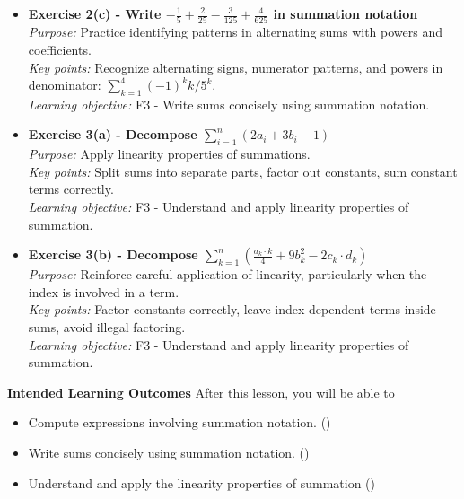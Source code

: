 \documentclass[10pt]{article}
\begin{document}
{{\begin{itemize}
    \item \textbf{Exercise 2(c) - Write $-\frac15+\frac2{25}-\frac3{125}+\frac4{625}$ in summation notation} \\
    \textit{Purpose:} Practice identifying patterns in alternating sums with powers and coefficients. \\
    \textit{Key points:} Recognize alternating signs, numerator patterns, and powers in denominator: $\sum_{k=1}^{4} (-1)^k k/5^k$. \\
    \textit{Learning objective:} F3 - Write sums concisely using summation notation.

    \item \textbf{Exercise 3(a) - Decompose $\displaystyle\sum_{i=1}^n (2a_i+3b_i-1)$} \\
    \textit{Purpose:} Apply linearity properties of summations. \\
    \textit{Key points:} Split sums into separate parts, factor out constants, sum constant terms correctly. \\
    \textit{Learning objective:} F3 - Understand and apply linearity properties of summation.

    \item \textbf{Exercise 3(b) - Decompose $\displaystyle\sum_{k=1}^n \left(\frac{a_k\cdot k}4+9b_k^2-2c_k\cdot d_k\right)$} \\
    \textit{Purpose:} Reinforce careful application of linearity, particularly when the index is involved in a term. \\
    \textit{Key points:} Factor constants correctly, leave index-dependent terms inside sums, avoid illegal factoring. \\
    \textit{Learning objective:} F3 - Understand and apply linearity properties of summation.
\end{itemize}
}}

\textbf{Intended Learning Outcomes}
After this lesson, you will be able to 

\begin{itemize}
    \item Compute expressions involving summation notation. ()
    \item Write sums concisely using summation notation. ()
    \item Understand and apply the linearity properties of summation ()
\end{itemize}
\end{document}

